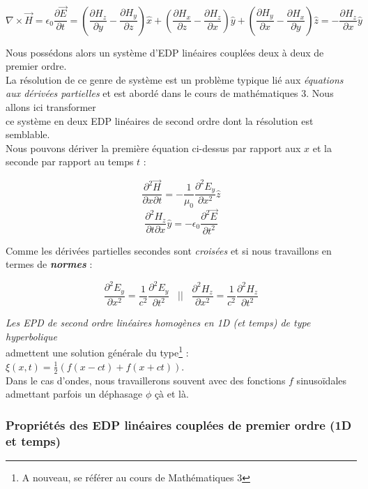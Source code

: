 \documentclass[a4paper,12pt]{article}
\begin{document}
\[\nabla \times \vec{H} = \epsilon_{0} \frac{\partial \vec{E}}{\partial t} = (\frac{\partial H_{z}}{\partial y} - \frac{\partial H_{y}}{\partial z})\hat{x} +   (\frac{\partial H_{x}}{\partial z} - \frac{\partial H_{z}}{\partial x})\hat{y} +
 (\frac{\partial H_{y}}{\partial x} - \frac{\partial H_{x}}{\partial y})\hat{z} = -\frac{\partial H_{z}}{\partial x} \hat{y}
\]

Nous possédons alors un système d'EDP linéaires couplées deux à deux de premier ordre. \\
La résolution de ce genre de système est un problème typique lié aux \textit{équations aux dérivées partielles} et est abordé dans le cours
de mathématiques 3. Nous allons ici transformer \\ce système en deux EDP linéaires de second ordre dont la résolution est semblable. \\
Nous pouvons dériver la première équation ci-dessus par rapport aux $x$ et la seconde par rapport au temps $t$ : 

\[  \frac{\partial^{2} \vec{H}}{\partial x \partial t} = -\frac{1}{\mu_{0}} \frac{\partial^{2} E_{y}}{\partial x^{2}} \hat{z}\]
\[  \frac{\partial^{2} H_{z}}{\partial t \partial x} \hat{y} = - \epsilon_{0} \frac{\partial^{2} \vec{E}}{\partial t^{2}} \]

Comme les dérivées partielles secondes sont \textit{croisées} et si nous travaillons en termes de \textbf{\textit{normes}} :

\[\frac{\partial^{2} E_{y}}{\partial x^{2}} = \frac{1}{c^{2}}  \frac{\partial^{2} E_{y}}{\partial t^{2}} \hspace{10pt} \mbox{||} \hspace{10pt} \frac{\partial^{2} H_{z}}{\partial x^{2}} = \frac{1}{c^{2}}  \frac{\partial^{2} H_{z}}{\partial t^{2}}\]

\newpage

\textit{Les EPD de second ordre linéaires homogènes en 1D (et temps) de type hyperbolique} \\admettent une solution générale du type\footnote{A nouveau, se référer au cours de Mathématiques 3}  : 
$ \xi(x,t) = \frac{1}{2}(f(x-ct)+f(x+ct)) $. \\ 
Dans le cas d'ondes, nous travaillerons souvent avec des fonctions $f$ sinusoïdales admettant parfois un déphasage $\phi$ çà et là. 
 

\subsubsection{Propriétés des EDP linéaires couplées de premier ordre (1D et temps)}
\end{document}

